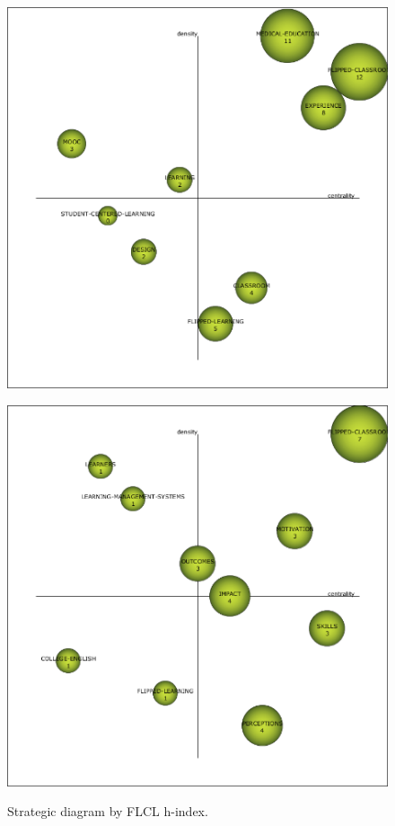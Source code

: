 \documentclass{textolivre}
\begin{document}
\begin{figure}[htbp]
\begin{minipage}{.45\textwidth}
 \label{fig03d}
 \end{minipage}
 \par\vspace{2ex}
 \begin{minipage}{.45\textwidth}
 \includegraphics[width=\textwidth]{Fig03e.png}
 \label{fig03e}
 \end{minipage}
 \hfill
 \begin{minipage}{.45\textwidth}
 \includegraphics[width=\textwidth]{Fig03f.png}
 \label{fig03f}
 \end{minipage}
\caption{Strategic diagram by FLCL h-index.}
\label{fig03}
\end{figure}
 
\end{document}
